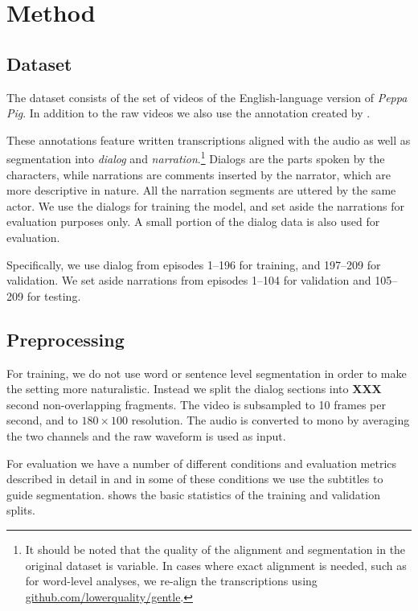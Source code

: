 \section{Method}
\label{sec:method}

\subsection{Dataset}
The dataset consists of the set of videos of the
English-language version of {\it Peppa Pig}. In addition to the raw
videos we  also use the annotation created by
\citet{papasarantopoulos2021narration}.

These annotations feature written transcriptions aligned with the
audio as well as segmentation into {\it dialog} and {\it
  narration}.\footnote{It should be noted that the quality of the
  alignment and segmentation in the original dataset is variable. In
  cases where exact alignment is needed, such as for word-level
  analyses, we re-align the transcriptions using
  \url{github.com/lowerquality/gentle}.}  Dialogs are the parts spoken
by the characters, while narrations are comments inserted by the
narrator, which are more descriptive in nature. All the narration
segments are uttered by the same actor. We use the dialogs for
training the model, and set aside the narrations for evaluation
purposes only. A small portion of the dialog data is also used for
evaluation.

Specifically, we use dialog from episodes 1--196 for training, and
197--209 for validation. We set aside narrations from episodes 1--104
for validation and 105--209 for testing.


\subsection{Preprocessing}
For training, we do not use word or sentence level segmentation in
order to make the setting more naturalistic. Instead we split the
dialog sections into {\bf XXX}  second non-overlapping fragments. The video
is subsampled to 10 frames per second, and to $180\times 100$ resolution. The
audio is converted to mono by averaging the two channels  and the raw
waveform is used as input.


For evaluation we have a number of different conditions and evaluation
metrics described in detail in  and in some of these
conditions we use the subtitles to guide
segmentation.  shows the basic statistics of the
training and validation splits.

